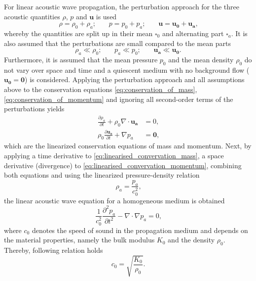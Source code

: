 For linear acoustic wave propagation, the perturbation approach for the three acoustic quantities $\rho$, $p$ and $\boldsymbol{u}$ is used
\begin{equation}
	\rho = \rho_0 + \rho_a\text{;}\qquad p = p_0 + p_a\text{;}\qquad \boldsymbol{u} = \boldsymbol{u_0} + \boldsymbol{u_a}\text{,}
\end{equation}
whereby the quantities are split up in their mean $\square_0$ and alternating part $\square_a$. It is also assumed that the perturbations are small compared to the mean parts
\begin{equation}
	\rho_a \ll \rho_0\text{;}\qquad p_a \ll p_0\text{;}\qquad \boldsymbol{u_a} \ll \boldsymbol{u_0}\text{.}
\end{equation}
Furthermore, it is assumed that the mean pressure $p_0$ and the mean density $\rho_0$ do not vary over space and time and a quiescent medium with no background flow ($\boldsymbol{u_0} = \boldsymbol{0}$) is considered. Applying the perturbation approach and all assumptions above to the conservation equations \cref{eq:conservation_of_mass}, \cref{eq:conservation_of_momentum} and ignoring all second-order terms of the perturbations yields
\begin{align}
	\frac{\partial \rho_a}{\partial t} + \rho_0\nabla\cdot\boldsymbol{u_a} &= 0\text{,} \label{eq:linearised_convervation_mass} \\ 
	\rho_0\frac{\partial \boldsymbol{u_a}}{\partial t} + \nabla p_a &= \boldsymbol{0}\text{,} \label{eq:linearised_convervation_momentum}
\end{align}
which are the linearized conservation equations of mass and momentum. Next, by applying a time derivative to \cref{eq:linearised_convervation_mass}, a space derivative (divergence) to \cref{eq:linearised_convervation_momentum}, combining both equations and using the linearized pressure-density relation
\begin{equation}
	\rho_a = \frac{p_a}{c_0^2}\text{,}
\end{equation}
the linear acoustic wave equation for a homogeneous medium is obtained
\begin{equation}
	\frac{1}{c_0^2}\frac{\partial^2 p_a}{\partial t^2} - \nabla\cdot\nabla p_a = 0\text{,} \label{eq:wave_equation}
\end{equation}
where $c_0$ denotes the speed of sound in the propagation medium and depends on the material properties, namely the bulk modulus $K_0$ and the density $\rho_0$. Thereby, following relation holds \cite{fahy_foundations_2001, kinsler_fundamentals_2000}
\begin{equation}
	c_0 = \sqrt{\frac{K_0}{\rho_0}}\text{.}
\end{equation}


